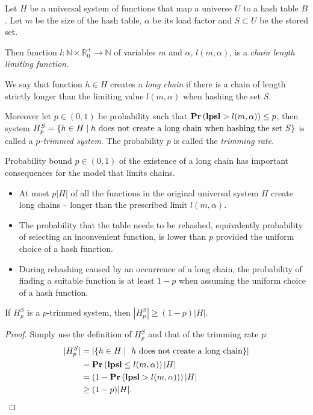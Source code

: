 \begin{definition}
Let $H$ be a universal system of functions that map a universe $U$ to a hash table $B$. Let $m$ be the size of the hash table, $\alpha$ be its load factor and $S \subset U$ be the stored set. 

Then function $l: \mathbb{N} \times \mathbb{R}_{0}^{+} \rightarrow \mathbb{N}$ of variables $m$ and $\alpha$, $l(m, \alpha)$, is a \emph{chain length limiting function}. 

We say that function $h \in H$ creates a \emph{long chain} if there is a chain of length strictly longer than the limiting value $l(m, \alpha)$ when hashing the set $S$.

Moreover let $p \in (0, 1)$ be probability such that $\mathbf{Pr}\left(\mathbf{lpsl} > l(m, \alpha)\right) \leq p$, then system $H_p^S = \{ h \in H \mid h \text{ does not create a long chain when hashing the set $S$} \}$ is called a \emph{$p$-trimmed system}. The probability $p$ is called the \emph{trimming rate}.
\end{definition}

Probability bound $p \in (0, 1)$ of the existence of a long chain has important consequences for the model that limits chains.
\begin{itemize}
\item At most $p|H|$ of all the functions in the original universal system $H$ create long chains -- longer than the prescribed limit $l(m, \alpha)$. 
\item The probability that the table needs to be rehashed, equivalently probability of selecting an inconvenient function, is lower than $p$ provided the uniform choice of a hash function.
\item During rehashing caused by an occurrence of a long chain, the probability of finding a suitable function is at least $1 - p$ when assuming the uniform choice of a hash function.
\end{itemize}

\begin{lemma}
\label{lemma-size-of-trimmed-system}
If $H_p^S$ is a $p$-trimmed system, then $|H_p^S| \geq (1 - p)|H|$.
\end{lemma}
\begin{proof}
Simply use the definition of $H_p^S$ and that of the trimming rate $p$:
\[
\begin{split}
|H_p^S|
	& = |\lbrace h \in H \mid \text{ $h$ does not create a long chain} \rbrace| \\
	& =\mathbf{Pr}\left(\mathbf{lpsl} \leq l(m, \alpha)\right) |H| \\
	& = \left(1 - \mathbf{Pr}\left(\mathbf{lpsl} > l(m, \alpha)\right)\right) |H| \\
	& \geq (1 - p)|H| \text{.}
\end{split}
\]
\end{proof}

